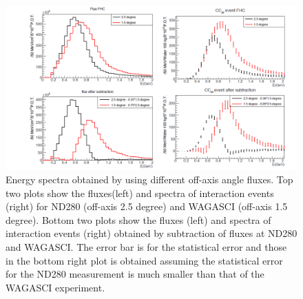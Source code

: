 \begin{figure}[tbhp]
\begin{center}
\includegraphics[width=\textwidth]{fig/fluxsubtractFHC.pdf}
\end{center}
\caption{Energy spectra obtained by using different off-axis angle fluxes.
  Top two plots show the fluxes(left) and spectra of interaction events (right) for ND280 (off-axis 2.5 degree) and WAGASCI (off-axis 1.5 degree). Bottom two plots show the fluxes (left) and spectra of interaction events (right) obtained by
  subtraction of fluxes at ND280 and WAGASCI.
  The error bar is for the statistical error and those in the bottom right plot is obtained assuming the statistical error
  for the ND280 measurement is much smaller than that of the WAGASCI experiment.
}
\label{fig:fluxsubtfhc}
\end{figure}




